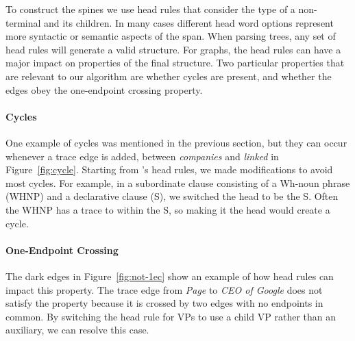 To construct the spines we use head rules that consider the type of a non-terminal and its children.
In many cases different head word options represent more syntactic or semantic aspects of the span.
When parsing trees, any set of head rules will generate a valid structure.
For graphs, the head rules can have a major impact on properties of the final structure.
Two particular properties that are relevant to our algorithm are whether cycles are present, and whether the edges obey the one-endpoint crossing property.

\paragraph{Cycles}
One example of cycles was mentioned in the previous section, but they can occur whenever a trace edge is added, \myeg between \emph{companies} and \emph{linked} in Figure~\ref{fig:cycle}.
Starting from \textcite{cck}'s head rules, we made modifications to avoid most cycles.
For example, in a subordinate clause consisting of a Wh-noun phrase (WHNP) and a declarative clause (S), we switched the head to be the S.
Often the WHNP has a trace to within the S, so making it the head would create a cycle.

\paragraph{One-Endpoint Crossing}
The dark edges in Figure~\ref{fig:not-1ec} show an example of how head rules can impact this property.
The trace edge from \emph{Page} to \emph{CEO of Google} does not satisfy the \oneEC property because it is crossed by two edges with no endpoints in common.
By switching the head rule for VPs to use a child VP rather than an auxiliary, we can resolve this case.

